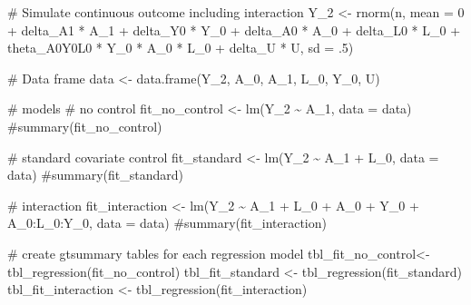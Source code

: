 \documentclass[
  singlecolumn]{article}
\newenvironment{Shaded}{\begin{snugshade}}{\end{snugshade}}
\newcommand{\AttributeTok}[1]{\textcolor[rgb]{0.40,0.45,0.13}{#1}}
\newcommand{\CommentTok}[1]{\textcolor[rgb]{0.37,0.37,0.37}{#1}}
\newcommand{\DecValTok}[1]{\textcolor[rgb]{0.68,0.00,0.00}{#1}}
\newcommand{\FunctionTok}[1]{\textcolor[rgb]{0.28,0.35,0.67}{#1}}
\newcommand{\NormalTok}[1]{\textcolor[rgb]{0.00,0.23,0.31}{#1}}
\newcommand{\OtherTok}[1]{\textcolor[rgb]{0.00,0.23,0.31}{#1}}
\newcommand{\SpecialCharTok}[1]{\textcolor[rgb]{0.37,0.37,0.37}{#1}}
\begin{document}
\begin{Shaded}
\begin{Highlighting}[]
\CommentTok{\# Simulate continuous outcome including interaction}
\NormalTok{Y\_2 }\OtherTok{\textless{}{-}} \FunctionTok{rnorm}\NormalTok{(n,}
             \AttributeTok{mean =} \DecValTok{0} \SpecialCharTok{+}
\NormalTok{               delta\_A1 }\SpecialCharTok{*}\NormalTok{ A\_1 }\SpecialCharTok{+} 
\NormalTok{               delta\_Y0 }\SpecialCharTok{*}\NormalTok{ Y\_0 }\SpecialCharTok{+} 
\NormalTok{               delta\_A0 }\SpecialCharTok{*}\NormalTok{ A\_0 }\SpecialCharTok{+} 
\NormalTok{               delta\_L0 }\SpecialCharTok{*}\NormalTok{ L\_0 }\SpecialCharTok{+} 
\NormalTok{               theta\_A0Y0L0 }\SpecialCharTok{*}\NormalTok{ Y\_0 }\SpecialCharTok{*} 
\NormalTok{               A\_0 }\SpecialCharTok{*}\NormalTok{ L\_0 }\SpecialCharTok{+} 
\NormalTok{               delta\_U }\SpecialCharTok{*}\NormalTok{ U,}
             \AttributeTok{sd =}\NormalTok{ .}\DecValTok{5}\NormalTok{)}

\CommentTok{\# Data frame}
\NormalTok{data }\OtherTok{\textless{}{-}} \FunctionTok{data.frame}\NormalTok{(Y\_2, A\_0, A\_1, L\_0, Y\_0, U)}

\CommentTok{\# models}
\CommentTok{\# no control}
\NormalTok{fit\_no\_control }\OtherTok{\textless{}{-}} \FunctionTok{lm}\NormalTok{(Y\_2 }\SpecialCharTok{\textasciitilde{}}\NormalTok{ A\_1, }\AttributeTok{data =}\NormalTok{ data)}
\CommentTok{\#summary(fit\_no\_control)}

\CommentTok{\# standard covariate control}
\NormalTok{fit\_standard }\OtherTok{\textless{}{-}} \FunctionTok{lm}\NormalTok{(Y\_2 }\SpecialCharTok{\textasciitilde{}}\NormalTok{ A\_1 }\SpecialCharTok{+}\NormalTok{ L\_0, }\AttributeTok{data =}\NormalTok{ data)}
\CommentTok{\#summary(fit\_standard)}

\CommentTok{\# interaction}
\NormalTok{fit\_interaction  }\OtherTok{\textless{}{-}} \FunctionTok{lm}\NormalTok{(Y\_2 }\SpecialCharTok{\textasciitilde{}}\NormalTok{ A\_1 }\SpecialCharTok{+}\NormalTok{ L\_0 }\SpecialCharTok{+}\NormalTok{ A\_0 }\SpecialCharTok{+}\NormalTok{ Y\_0 }\SpecialCharTok{+}\NormalTok{ A\_0}\SpecialCharTok{:}\NormalTok{L\_0}\SpecialCharTok{:}\NormalTok{Y\_0, }\AttributeTok{data =}\NormalTok{ data)}
\CommentTok{\#summary(fit\_interaction)}


\CommentTok{\# create gtsummary tables for each regression model}
\NormalTok{tbl\_fit\_no\_control}\OtherTok{\textless{}{-}} \FunctionTok{tbl\_regression}\NormalTok{(fit\_no\_control)  }
\NormalTok{tbl\_fit\_standard }\OtherTok{\textless{}{-}} \FunctionTok{tbl\_regression}\NormalTok{(fit\_standard)}
\NormalTok{tbl\_fit\_interaction }\OtherTok{\textless{}{-}}
  \FunctionTok{tbl\_regression}\NormalTok{(fit\_interaction)}



\end{Highlighting}
\end{Shaded}
\end{document}
